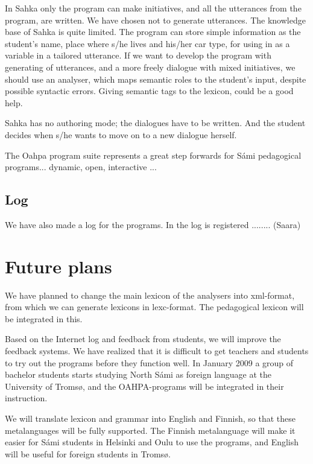 \documentclass[a4paper,12pt]{article}
\begin{document}
In Sahka only the program can make initiatives, and all the utterances from the program, are written. We have chosen not to generate utterances. The knowledge base of Sahka is quite limited. The program can store simple information as the student's name, place where s/he lives and his/her car type, for using in as a variable in a tailored utterance. If we want to develop the program with generating of utterances, and a more freely dialogue with mixed initiatives, we should use an analyser, which maps semantic roles to the student's input, despite possible syntactic errors. Giving semantic tags to the lexicon, could be a good help. 

Sahka has no authoring mode; the dialogues have to be written. And the student decides when s/he wants to move on to a new dialogue herself. %
 

The Oahpa program suite represents a great step forwards for Sámi pedagogical programs...
dynamic, open, interactive ...



\subsection{Log}
We have also made a log for the programs. In the log is registered ........ (Saara)

\section{Future plans}
We have planned to change the main lexicon of the analysers into xml-format, from which we can generate lexicons in lexc-format. The pedagogical lexicon will be integrated in this.

Based on the Internet log and feedback from students, we will improve the feedback systems. We have realized that it is difficult to get teachers and students to try out the programs before they function well. In January 2009 a group of bachelor students starts studying North Sámi as foreign language at the University of Tromsø, and the OAHPA-programs will be integrated in their instruction. 

We will translate lexicon and grammar into English and Finnish, so that these metalanguages will be fully supported. The Finnish metalanguage will make it easier for Sámi students in Helsinki and Oulu to use the programs, and English will be useful for foreign students in Tromsø.
\end{document}
